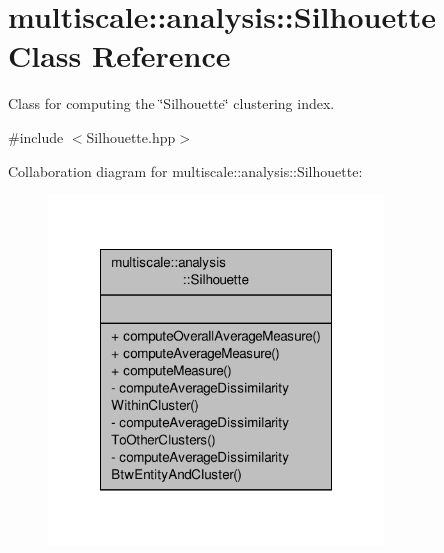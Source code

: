 \hypertarget{classmultiscale_1_1analysis_1_1Silhouette}{\section{multiscale\-:\-:analysis\-:\-:Silhouette Class Reference}
\label{classmultiscale_1_1analysis_1_1Silhouette}
}


Class for computing the \char`\"{}\-Silhouette\char`\"{} clustering index.  




{\ttfamily \#include $<$Silhouette.\-hpp$>$}



Collaboration diagram for multiscale\-:\-:analysis\-:\-:Silhouette\-:\nopagebreak
\begin{figure}[H]
\begin{center}
\leavevmode
\includegraphics[width=252pt]{classmultiscale_1_1analysis_1_1Silhouette__coll__graph}
\end{center}
\end{figure}
